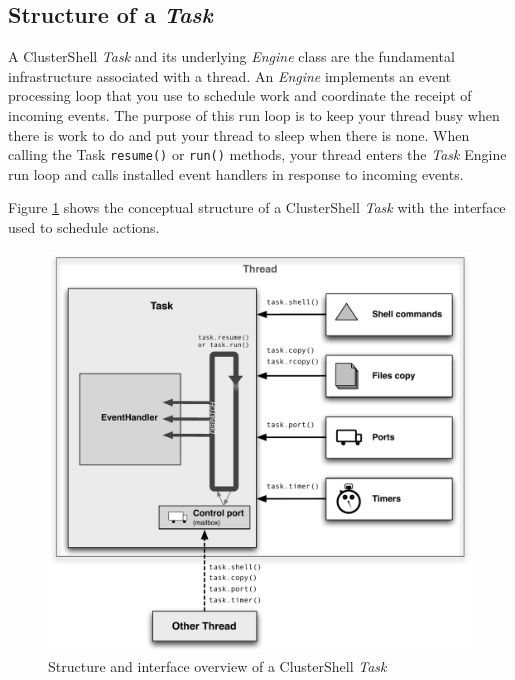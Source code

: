 \documentclass[english,a4paper]{csuserguide}
\newcommand{\Task}{\textit{Task}\xspace}
\newcommand{\Engine}{\textit{Engine}\xspace}
\begin{document}
\subsection{Structure of a \Task}
\label{class-Task}
A ClusterShell \Task and its underlying \Engine class are the fundamental infrastructure associated with a thread. An \Engine implements an event processing loop that you use to schedule work and coordinate the receipt of incoming events. The purpose of this run loop is to keep your thread busy when there is work to do and put your thread to sleep when there is none. When calling the Task \lstinline+resume()+ or \lstinline+run()+ methods, your thread enters the \Task Engine run loop and calls installed event handlers in response to incoming events.

Figure \ref{TaskInterface} shows the conceptual structure of a ClusterShell \Task with the interface used to schedule actions.

\begin{figure}[!ht]
\begin{center}
\includegraphics[scale=0.80]{TaskInterface}
\caption{Structure and interface overview of a ClusterShell \Task}
\label{TaskInterface}
\end{center}
\end{figure}
\end{document}
